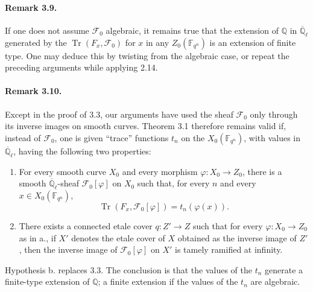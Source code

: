\documentclass[11pt]{article}
\newcommand{\F}{\mathbb{F}}
\newcommand{\Q}{\mathbb{Q}}
\newcommand{\Ql}{\overline{\mathbb Q}_{\ell}}
\newcommand{\Tr}{\operatorname{Tr}}
\begin{document}
\paragraph{Remark 3.9.}
If one does not assume $\mathcal F_0$ algebraic, it remains true that the extension of $\Q$ in $\Ql$ generated by the $\Tr(F_x,\mathcal F_0)$ for $x$ in any $Z_0(\F_{q^n})$ is an extension of finite type.
One may deduce this by twisting from the algebraic case, or repeat the preceding arguments while applying 2.14.

\paragraph{Remark 3.10.}
Except in the proof of 3.3, our arguments have used the sheaf $\mathcal F_0$ only through its inverse images on smooth curves.
Theorem 3.1 therefore remains valid if, instead of $\mathcal F_0$, one is given ``trace'' functions $t_n$ on the $X_0(\F_{q^n})$, with values in $\Ql$, having the following two properties:
\begin{enumerate}[label=\alph*.]
\item For every smooth curve $X_0$ and every morphism $\varphi:X_0\to Z_0$, there is a smooth $\Ql$-sheaf $\mathcal F_0[\varphi]$ on $X_0$ such that, for every $n$ and every $x\in X_0(\F_{q^n})$,
\[
 \Tr(F_x,\mathcal F_0[\varphi])=t_n(\varphi(x)).
\]
\item There exists a connected etale cover $q:Z'\to Z$ such that for every $\varphi:X_0\to Z_0$ as in a., if $X'$ denotes the etale cover of $X$ obtained as the inverse image of $Z'$, then the inverse image of $\mathcal F_0[\varphi]$ on $X'$ is tamely ramified at infinity.
\end{enumerate}
Hypothesis b. replaces 3.3.
The conclusion is that the values of the $t_n$ generate a finite-type extension of $\Q$; a finite extension if the values of the $t_n$ are algebraic.
\end{document}
